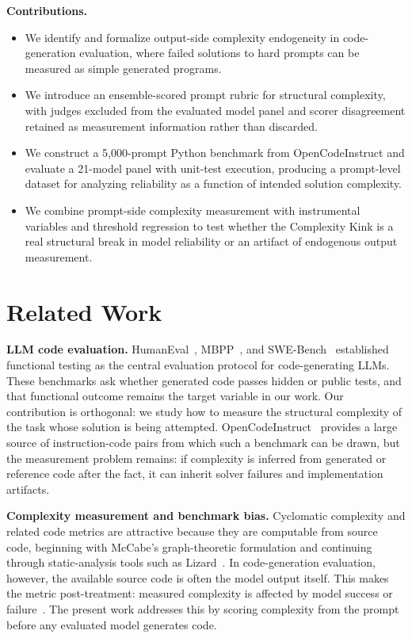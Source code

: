 \documentclass{article}
\begin{document}
\vspace{2pt}
\noindent\textbf{Contributions.}
\begin{itemize}
\item We identify and formalize output-side complexity endogeneity in code-generation evaluation, where failed solutions to hard prompts can be measured as simple generated programs.
\item We introduce an ensemble-scored prompt rubric for structural complexity, with judges excluded from the evaluated model panel and scorer disagreement retained as measurement information rather than discarded.
\item We construct a 5{,}000-prompt Python benchmark from OpenCodeInstruct and evaluate a 21-model panel with unit-test execution, producing a prompt-level dataset for analyzing reliability as a function of intended solution complexity.
\item We combine prompt-side complexity measurement with instrumental variables and threshold regression to test whether the Complexity Kink is a real structural break in model reliability or an artifact of endogenous output measurement.
\end{itemize}

\section{Related Work}

\textbf{LLM code evaluation.} HumanEval~\cite{chen2021evaluating}, MBPP~\cite{austin2021program}, and SWE-Bench~\cite{jimenez2023swebench} established functional testing as the central evaluation protocol for code-generating LLMs. These benchmarks ask whether generated code passes hidden or public tests, and that functional outcome remains the target variable in our work. Our contribution is orthogonal: we study how to measure the structural complexity of the task whose solution is being attempted. OpenCodeInstruct~\cite{opencodeinst} provides a large source of instruction-code pairs from which such a benchmark can be drawn, but the measurement problem remains: if complexity is inferred from generated or reference code after the fact, it can inherit solver failures and implementation artifacts.

\textbf{Complexity measurement and benchmark bias.} Cyclomatic complexity and related code metrics are attractive because they are computable from source code, beginning with McCabe's graph-theoretic formulation and continuing through static-analysis tools such as Lizard~\cite{mccabe1976complexity,lizard}. In code-generation evaluation, however, the available source code is often the model output itself. This makes the metric post-treatment: measured complexity is affected by model success or failure~\cite{montgomery2018posttreatment}. The present work addresses this by scoring complexity from the prompt before any evaluated model generates code.
\end{document}
